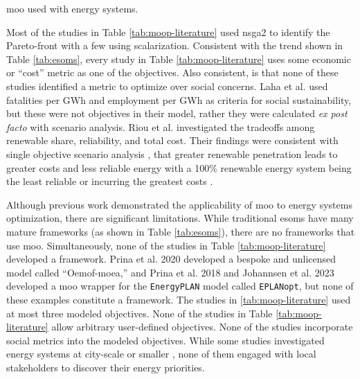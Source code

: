 \begin{table}[ht!]
    \centering
    \caption{\ac{moo} used with energy systems.}
    \label{tab:moop-literature}
    \resizebox*{\textwidth}{!}{}
\end{table}
Most of the studies in Table \ref{tab:moop-literature} used \ac{nsga2} to
identify the Pareto-front with a few using scalarization. Consistent with the
trend shown in Table \ref{tab:esoms}, every study in Table
\ref{tab:moop-literature} uses some economic or ``cost'' metric as one of the
objectives. Also consistent, is that none of these studies identified a metric
to optimize over social concerns. Laha et al. \cite{laha_low_2021} used
fatalities per GWh and employment per GWh as criteria for social sustainability,
but these were not objectives in their model, rather they were calculated
\textit{ex post facto} with scenario analysis. Riou et al.
\cite{riou_multi-objective_2021} investigated the tradeoffs among renewable
share, reliability, and total cost. Their findings were consistent with single
objective scenario analysis \cite{de_sisternes_value_2016}, that greater
renewable penetration leads to greater costs and less reliable energy with a
100\% renewable energy system being the least reliable or incurring the greatest
costs \cite{riou_multi-objective_2021}. 

Although previous work demonstrated the applicability of \ac{moo} to energy
systems optimization, there are significant limitations. While traditional
\acp{esom} have many mature frameworks (as shown in Table \ref{tab:esoms}),
there are no frameworks that use \ac{moo}. Simultaneously, none of the studies
in Table \ref{tab:moop-literature} developed a framework. Prina et al. 2020
\cite{prina_multi-objective_2020} developed a bespoke and unlicensed model
called ``Oemof-moea,'' and Prina et al. 2018 \cite{prina_multi-objective_2018}
and Johannsen et al. 2023 \cite{johannsen_municipal_2023} developed a \ac{moo}
wrapper for the \texttt{EnergyPLAN} model called \texttt{EPLANopt}, but none of
these examples constitute a framework. The studies in \ref{tab:moop-literature}
used at most three modeled
objectives\cite{riou_multi-objective_2021,de-leon_almaraz_deployment_2015,
de-leon_almaraz_assessment_2013}. None of the studies in Table
\ref{tab:moop-literature} allow arbitrary user-defined objectives. None of the
studies incorporate social metrics into the modeled objectives. While some
studies investigated energy systems at city-scale or smaller
\cite{riou_multi-objective_2021,
mayer_environmental_2020,fleischhacker_portfolio_2019,johannsen_municipal_2023},
none of them engaged with local stakeholders to discover their energy
priorities.


